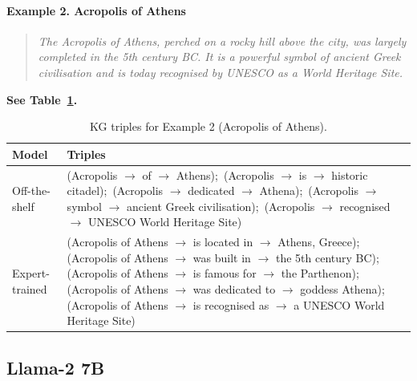 \documentclass[11pt]{article}
\begin{document}
{\paragraph{Example 2. Acropolis of Athens}
\begin{quote}\small
\textit{The Acropolis of Athens, perched on a rocky hill above the city, was largely
completed in the 5th century BC. It is a powerful symbol of ancient Greek civilisation and
is today recognised by UNESCO as a World Heritage Site.}
\end{quote}
\noindent\textbf{See Table~\ref{tab:acropolis}.}
\begin{table}[h]
\centering\small
\caption{KG triples for Example 2 (Acropolis of Athens).}\label{tab:acropolis}
\begin{tabular}{@{}p{}p{}@{}}
\textbf{Model} & \textbf{Triples}\\\hline
Off-the-shelf &
\ttfamily(Acropolis $\to$ of $\to$ Athens);\,
(Acropolis $\to$ is $\to$ historic citadel);\,
(Acropolis $\to$ dedicated $\to$ Athena);\,
(Acropolis $\to$ symbol $\to$ ancient Greek civilisation);\,
(Acropolis $\to$ recognised $\to$ UNESCO World Heritage Site)
\\
Expert-trained &
\ttfamily(Acropolis of Athens $\to$ is located in $\to$ Athens, Greece);\,
(Acropolis of Athens $\to$ was built in $\to$ the 5th century BC);\,
(Acropolis of Athens $\to$ is famous for $\to$ the Parthenon);\,
(Acropolis of Athens $\to$ was dedicated to $\to$ goddess Athena);\,
(Acropolis of Athens $\to$ is recognised as $\to$ a UNESCO World Heritage Site)
\end{tabular}
\end{table}

\subsection{Llama-2 7B}

}
\end{document}
